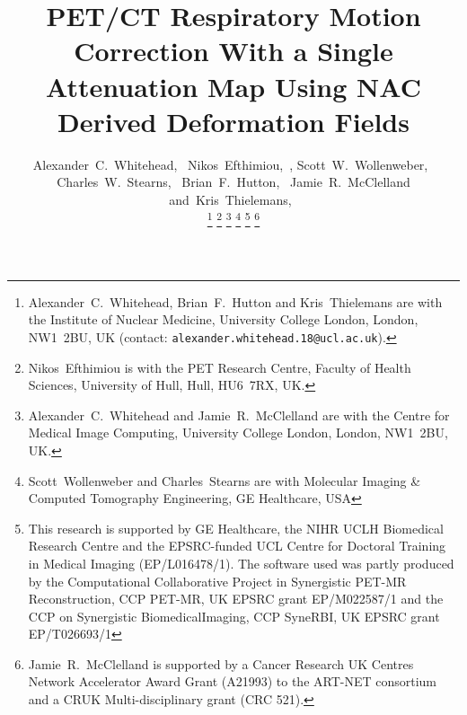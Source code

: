 \documentclass[10pt, twocolumn, twoside, letterpaper]{IEEEtran}
\begin{document}
\title{PET/CT Respiratory Motion Correction With a Single Attenuation Map Using NAC Derived Deformation Fields }

\pagestyle{plain}

\author{Alexander~C.~Whitehead,~
        Nikos~Efthimiou,~,
        Scott~W.~Wollenweber,~
        Charles~W.~Stearns,~
        Brian~F.~Hutton,~
        Jamie~R.~McClelland
        and~Kris~Thielemans,~%

    \thanks{Alexander~C.~Whitehead, Brian~F.~Hutton and Kris~Thielemans are with the Institute of Nuclear Medicine, University College London, London, NW1~2BU, UK (contact: \texttt{alexander.whitehead.18@ucl.ac.uk}).}%
    \thanks{Nikos~Efthimiou is with the PET Research Centre, Faculty of Health Sciences, University of Hull, Hull, HU6~7RX, UK.}%
    \thanks{Alexander~C.~Whitehead and Jamie~R.~McClelland are with the Centre for Medical Image Computing, University College London, London, NW1~2BU, UK.}%
    \thanks{Scott~Wollenweber and Charles~Stearns are with Molecular Imaging \& Computed Tomography Engineering, GE Healthcare, USA}%
    \thanks{This research is supported by GE Healthcare, the NIHR UCLH Biomedical Research Centre and the EPSRC-funded UCL Centre for Doctoral Training in Medical Imaging (EP/L016478/1). The software used was partly produced by the Computational Collaborative Project in Synergistic PET-MR Reconstruction, CCP PET-MR, UK EPSRC grant EP/M022587/1 and
    the CCP on Synergistic BiomedicalImaging, CCP SyneRBI, UK EPSRC grant EP/T026693/1}%
    \thanks{Jamie~R.~McClelland is supported by a Cancer Research UK Centres Network Accelerator Award Grant (A21993) to the ART-NET consortium and a CRUK Multi-disciplinary grant (CRC 521).}%
}

\maketitle
\IEEEpeerreviewmaketitle
\end{document}
